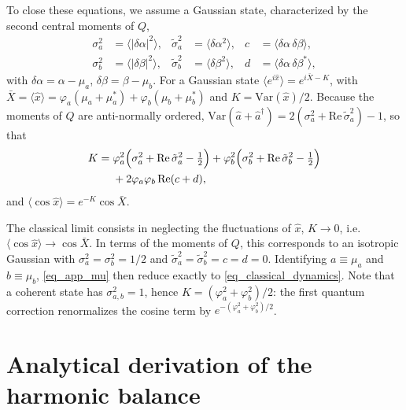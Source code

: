 \documentclass[aps,prx,reprint,floatfix,amsmath,amssymb,longbibliography]{revtex4-2}
\newcommand{\da}{^\dagger}
\newcommand{\ha}{\hat{a}}
\begin{document}
To close these equations, we assume a Gaussian state, characterized by the second central moments of $Q$,
\begin{equation}
\begin{aligned}
    \sigma_a^2&=\langle|\delta\alpha|^2\rangle, & \tilde\sigma_a^2&=\langle\delta\alpha^2\rangle, & c&=\langle\delta\alpha\,\delta\beta\rangle,\\
    \sigma_b^2&=\langle|\delta\beta|^2\rangle, & \tilde\sigma_b^2&=\langle\delta\beta^2\rangle, & d&=\langle\delta\alpha\,\delta\beta^*\rangle,
\end{aligned}
\end{equation}
with $\delta\alpha=\alpha-\mu_a$, $\delta\beta=\beta-\mu_b$. For a Gaussian state $\langle e^{i\hat x}\rangle=e^{i\bar X-K}$, with $\bar X=\langle\hat x\rangle=\varphi_a(\mu_a+\mu_a^*)+\varphi_b(\mu_b+\mu_b^*)$ and $K=\mathrm{Var}(\hat x)/2$. Because the moments of $Q$ are anti-normally ordered, $\mathrm{Var}(\ha+\ha\da)=2(\sigma_a^2+\mathrm{Re}\,\tilde\sigma_a^2)-1$, so that
\begin{equation}
\begin{split}
    K =\;& \varphi_a^2\Bigl(\sigma_a^2+\mathrm{Re}\,\tilde\sigma_a^2-\tfrac12\Bigr)
         +\varphi_b^2\Bigl(\sigma_b^2+\mathrm{Re}\,\tilde\sigma_b^2-\tfrac12\Bigr)\\
         &+2\varphi_a\varphi_b\,\mathrm{Re}(c+d),
\end{split}
\end{equation}
and $\langle\cos\hat x\rangle=e^{-K}\cos\bar X$.

The classical limit consists in neglecting the fluctuations of $\hat x$, $K\to0$, i.e.\ $\langle\cos\hat x\rangle\to\cos\bar X$. In terms of the moments of $Q$, this corresponds to an isotropic Gaussian with $\sigma_a^2=\sigma_b^2=1/2$ and $\tilde\sigma_a^2=\tilde\sigma_b^2=c=d=0$. Identifying $a\equiv\mu_a$ and $b\equiv\mu_b$, \cref{eq_app_mu} then reduce exactly to \cref{eq_classical_dynamics}. Note that a coherent state has $\sigma_{a,b}^2=1$, hence $K=(\varphi_a^2+\varphi_b^2)/2$: the first quantum correction renormalizes the cosine term by $e^{-(\varphi_a^2+\varphi_b^2)/2}$.
\fi

\section{Analytical derivation of the harmonic balance}
\label{app:derivation_harmonic_balance}
\end{document}
